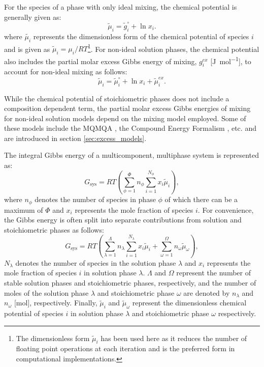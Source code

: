 For the species of a phase with only ideal mixing, the chemical potential is generally given as:
    \begin{equation}
            \tilde{\mu}_{i} = \tilde{g}_{i}^\circ + \ln x_{i}.
    \end{equation}
where $\tilde{\mu_i}$ represents the dimensionless form of the chemical potential of species $i$ and is given as $\tilde{\mu}_i = \mu_i / RT$\footnote{The dimensionless form $\tilde{\mu}_i$ has been used here as it reduces the number of floating point operations at each iteration and is the preferred form in computational implementations.}.
For non-ideal solution phases, the chemical potential also includes the partial molar excess Gibbs energy of mixing, $g_{i}^{ex}$ [\si{\joule \per \mole}], to account for non-ideal mixing as follows:
    \begin{equation}\label{eq:mu_ex}
            \tilde{\mu}_i = \tilde{\mu}_{i}^\circ + \ln x_{i} + \tilde{\mu}_{i}^{ex}.
    \end{equation}

    While the chemical potential of stoichiometric phases does not include a composition dependent term, the partial molar excess Gibbs energies of mixing for non-ideal solution models depend on the mixing model employed. Some of these models include the MQMQA \cite{Pelton00,Pelton01,Chartrand01,Pelton01b,Lambotte11}, the Compound Energy Formalism \cite{Hillert01}, etc. and are introduced in section \ref{sec:excess_models}.

The integral Gibbs energy of a multicomponent, multiphase system is represented as:
\begin{equation}\label{eqn:integralGibbs1}
            G_\text{sys} = RT \left ( \sum_{\phi=1}^{\Phi} n_{\phi} \sum_{i=1}^{N_{\phi}}x_{i}\tilde{\mu}_i \right ),
\end{equation}
where $n_{\phi}$ denotes the number of species in phase $\phi$ of which there can be a maximum of $\Phi$ and $x_{i}$ represents the mole fraction of species $i$. For convenience, the Gibbs energy is often split into separate contributions from solution and stoichiometric phases as follows:
    \begin{equation}\label{eqn:integralGibbs}
            G_\text{sys} = RT \left ( \sum_{\lambda=1}^{\Lambda} n_{\lambda} \sum_{i=1}^{N_{\lambda}}x_{i}\tilde{\mu}_i + \sum_{\omega=1}^{\Omega} n_{\omega} \tilde{\mu}_{\omega} \right ),
    \end{equation}
    $N_{\lambda}$ denotes the number of species in the solution phase $\lambda$ and $x_{i}$ represents the mole fraction of species $i$ in solution phase $\lambda$. $\Lambda$ and $\Omega$ represent the number of stable solution phases and stoichiometric phases, respectively, and the number of moles of the solution phase $\lambda$ and stoichiometric phase $\omega$ are denoted by $n_\lambda$ and $n_\omega$ [\si{\mole}], respectively. Finally, $\tilde{\mu}_i$ and $\tilde{\mu}_\omega$ represent the dimensionless chemical potential of species $i$ in solution phase $\lambda$ and stoichiometric phase $\omega$ respectively.


